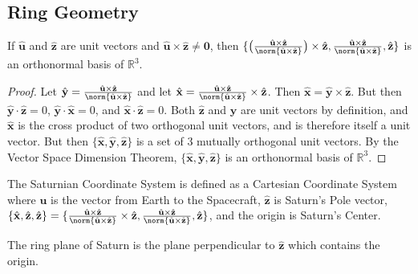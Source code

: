 \documentclass[crop=false,class=book,oneside]{standalone}
\begin{document}
        \subsection{Ring Geometry}
            \begin{theorem}
            \label{theorem:ring_occ_geom_x_y_z_orthonormal_basis}
            If $\hat{\mathbf{u}}$ and $\hat{\mathbf{z}}$ are unit vectors and $\hat{\mathbf{u}}\times \hat{\mathbf{z}} \ne \mathbf{0}$, then $\{\big(\frac{\hat{\mathbf{u}}\times \hat{\mathbf{z}}}{\norm{\hat{\mathbf{u}}\times \hat{\mathbf{z}}}}\big)\times \hat{\mathbf{z}},\frac{\hat{\mathbf{u}}\times \hat{\mathbf{z}}}{\norm{\hat{\mathbf{u}}\times \hat{\mathbf{z}}}},\hat{\mathbf{z}}\}$ is an orthonormal basis of $\mathbb{R}^3$.
            \end{theorem}
            \begin{proof}
            Let $\hat{\mathbf{y}} = \frac{\hat{\mathbf{u}}\times \hat{\mathbf{z}}}{\norm{\hat{\mathbf{u}}\times \hat{\mathbf{z}}}}$ and let $\hat{\mathbf{x}} = \frac{\hat{\mathbf{u}}\times \hat{\mathbf{z}}}{\norm{\hat{\mathbf{u}}\times \hat{\mathbf{z}}}}\times \hat{\mathbf{z}}$. Then $\hat{\mathbf{x}} = \hat{\mathbf{y}}\times \hat{\mathbf{z}}$. But then $\hat{\mathbf{y}}\cdot \hat{\mathbf{z}} = 0$, $\hat{\mathbf{y}}\cdot \hat{\mathbf{x}} = 0$, and $\hat{\mathbf{x}}\cdot \hat{\mathbf{z}} = 0$. Both $\hat{\mathbf{z}}$ and $\hat{\mathbf{y}}$ are unit vectors by definition, and $\hat{\mathbf{x}}$ is the cross product of two orthogonal unit vectors, and is therefore itself a unit vector. But then $\{\hat{\mathbf{x}},\hat{\mathbf{y}},\hat{\mathbf{z}}\}$ is a set of $3$ mutually orthogonal unit vectors. By the Vector Space Dimension Theorem, $\{\hat{\mathbf{x}},\hat{\mathbf{y}},\hat{\mathbf{z}}\}$ is an orthonormal basis of $\mathbb{R}^3$.
            \end{proof}
            \begin{definition}
            The Saturnian Coordinate System is defined as a Cartesian Coordinate System where $\mathbf{u}$ is the vector from Earth to the Spacecraft, $\hat{\mathbf{z}}$ is Saturn's Pole vector, $\{\hat{\mathbf{x}},\hat{\mathbf{z}},\hat{\mathbf{z}}\} = \{\frac{\hat{\mathbf{u}}\times\hat{\mathbf{z}}}{\norm{\hat{\mathbf{u}}\times\hat{\mathbf{z}}}}\times\hat{\mathbf{z}},\frac{\hat{\mathbf{u}}\times\hat{\mathbf{z}}}{\norm{\hat{\mathbf{u}}\times\hat{\mathbf{z}}}},\hat{\mathbf{z}}\}$, and the origin is Saturn's Center.
            \end{definition}
            \begin{definition}
            The ring plane of Saturn is the plane perpendicular to $\hat{\mathbf{z}}$ which contains the origin.
            \end{definition}
\end{document}
